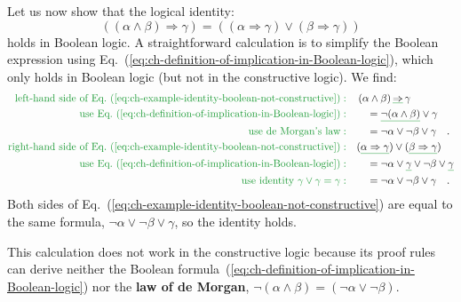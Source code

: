 Let us now show that the logical identity:
\begin{equation}
((\alpha\wedge\beta)\Rightarrow\gamma)=((\alpha\Rightarrow\gamma)\vee(\beta\Rightarrow\gamma))\label{eq:ch-example-identity-boolean-not-constructive}
\end{equation}
holds in Boolean logic. A straightforward calculation is to simplify
the Boolean expression using Eq.~(\ref{eq:ch-definition-of-implication-in-Boolean-logic}),
which only holds in Boolean logic (but not in the constructive logic).
We find:
\begin{align*}
{\color{greenunder}\text{left-hand side of Eq.~(\ref{eq:ch-example-identity-boolean-not-constructive})}:}\quad & \left(\alpha\wedge\beta\right)\gunderline{\Rightarrow}\,\gamma\\
{\color{greenunder}\text{use Eq.~(\ref{eq:ch-definition-of-implication-in-Boolean-logic})}:}\quad & \quad=\gunderline{\neg(\alpha\wedge\beta)}\vee\gamma\\
{\color{greenunder}\text{use de Morgan\textsf{'}s law}:}\quad & \quad=\neg\alpha\vee\neg\beta\vee\gamma\quad.\\
{\color{greenunder}\text{right-hand side of Eq.~(\ref{eq:ch-example-identity-boolean-not-constructive})}:}\quad & (\gunderline{\alpha\Rightarrow\gamma})\vee(\gunderline{\beta\Rightarrow\gamma})\\
{\color{greenunder}\text{use Eq.~(\ref{eq:ch-definition-of-implication-in-Boolean-logic})}:}\quad & \quad=\neg\alpha\vee\gunderline{\gamma}\vee\neg\beta\vee\gunderline{\gamma}\\
{\color{greenunder}\text{use identity }\gamma\vee\gamma=\gamma:}\quad & \quad=\neg\alpha\vee\neg\beta\vee\gamma\quad.
\end{align*}
Both sides of Eq.~(\ref{eq:ch-example-identity-boolean-not-constructive})
are equal to the same formula, $\neg\alpha\vee\neg\beta\vee\gamma$,
so the identity holds.

This calculation does not work in the constructive logic because its
proof rules can derive neither the Boolean formula~(\ref{eq:ch-definition-of-implication-in-Boolean-logic})
nor the \textbf{law of de Morgan}, $\neg(\alpha\wedge\beta)=\left(\neg\alpha\vee\neg\beta\right)$.

